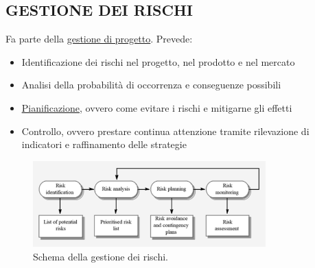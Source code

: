 		\subsection{GESTIONE DEI RISCHI}  \label{gestionerischi}
		Fa parte della \underline{\hyperref[gestioneprogetto]{gestione di progetto}}. Prevede:
			\begin{itemize}
				\item Identificazione dei rischi nel progetto, nel prodotto e nel mercato
				\item Analisi della probabilità di occorrenza e conseguenze possibili
				\item \underline{\hyperref[pianificazione]{Pianificazione}}, ovvero come evitare i rischi e mitigarne gli effetti
				\item Controllo, ovvero prestare continua attenzione tramite rilevazione di indicatori e raffinamento delle strategie
			\end{itemize}
		\begin{figure}[H]
			\centering
			\includegraphics[width=0.8\textwidth]{img/rischi}
			\caption{Schema della gestione dei rischi.}
		\end{figure}



